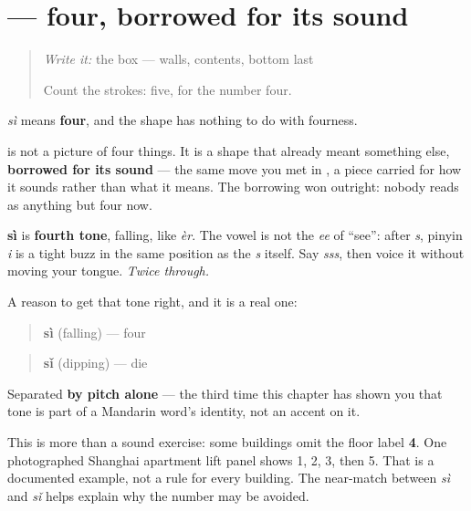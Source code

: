 \section[\texorpdfstring{\zh{四} (sì)}{四 (sì)}]{ — four, borrowed for its sound}

\label{lesson:ZH-C03-si}



\begin{quote}
\emph{Write it:} the box — walls, contents, bottom last

Count the strokes: five, for the number four.
\end{quote}

\begin{sounds}
\textbf{} \emph{sì} means \textbf{four}, and the shape has nothing to do with fourness.

 is not a picture of four things. It is a shape that already meant something else, \textbf{borrowed for its sound} — the same move you met in , a piece carried for how it sounds rather than what it means. The borrowing won outright: nobody reads  as anything but four now.

\textbf{sì} is \textbf{fourth tone}, falling, like \emph{èr}. The vowel is not the \emph{ee} of \textquotedblleft{}see\textquotedblright{}: after \emph{s}, pinyin \emph{i} is a tight buzz in the same position as the \emph{s} itself. Say \emph{sss}, then voice it without moving your tongue. \emph{Twice through.}
\end{sounds}

\begin{culture}
A reason to get that tone right, and it is a real one:

\begin{quote}
\textbf{sì} (falling) — four
\end{quote}

\begin{quote}
\textbf{sǐ} (dipping) — die
\end{quote}

Separated \textbf{by pitch alone} — the third time this chapter has shown you that tone is part of a Mandarin word's identity, not an accent on it.

This is more than a sound exercise: some buildings omit the floor label \textbf{4}. One photographed Shanghai apartment lift panel shows 1, 2, 3, then 5. That is a documented example, not a rule for every building. The near-match between \emph{sì} and \emph{sǐ} helps explain why the number may be avoided.
\end{culture}

